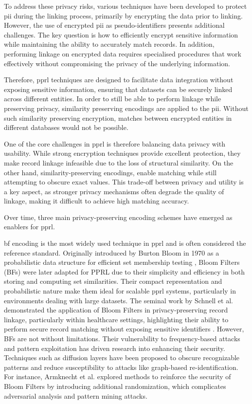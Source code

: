 To address these privacy risks, various techniques have been developed to protect \ac{pii} during the linking process, primarily by encrypting the data prior to linking. 
However, the use of encrypted \ac{pii} as pseudo-identifiers presents additional challenges.
The key question is how to efficiently encrypt sensitive information while maintaining the ability to accurately match records. 
In addition, performing linkage on encrypted data requires specialised procedures that work effectively without compromising the privacy of the underlying information.

Therefore, \ac{pprl} techniques are designed to facilitate data integration without exposing sensitive information, ensuring that datasets can be securely linked across different entities.
In order to still be able to perform linkage while preserving privacy, similarity preserving encodings are applied to the \ac{pii}.
Without such similarity preserving encryption, matches between encrypted entities in different databases would not be possible.

One of the core challenges in \ac{pprl} is therefore balancing data privacy with usability. 
While strong encryption techniques provide excellent protection, they make record linkage infeasible due to the loss of structural similarity. 
On the other hand, similarity-preserving encodings, enable matching while still attempting to obscure exact values. 
This trade-off between privacy and utility is a key aspect, as stronger privacy mechanisms often degrade the quality of linkage, making it difficult to achieve high matching accuracy.

Over time, three main privacy-preserving encoding schemes have emerged as enablers for \ac{pprl}. \cite{vidanage2020graph, schaefer2024}

\ac{bf} encoding is the most widely used technique in \ac{pprl} and is often considered the reference standard. 
Originally introduced by Burton Bloom in 1970 as a probabilistic data structure for efficient set membership testing \cite{bloom1970space}, Bloom Filters (BFs) were later adapted for PPRL due to their simplicity and efficiency in both storing and computing set similarities. 
Their compact representation and probabilistic nature make them ideal for scalable \ac{pprl} systems, particularly in environments dealing with large datasets. 
The seminal work by Schnell et al. demonstrated the application of Bloom Filters in privacy-preserving record linkage, particularly within healthcare settings, highlighting their ability to perform secure record matching without exposing sensitive identifiers \cite{schnell2009privacy}.
However, BFs are not without limitations. 
Their vulnerability to frequency-based attacks and pattern exploitation has driven research into enhancing their security. 
Techniques such as diffusion layers have been proposed to obscure recognizable patterns and reduce susceptibility to attacks like graph-based re-identification. 
For instance, Armknecht et al. explored methods to reinforce the security of Bloom Filters by introducing additional randomization, which complicates adversarial analysis and pattern mining attacks.

